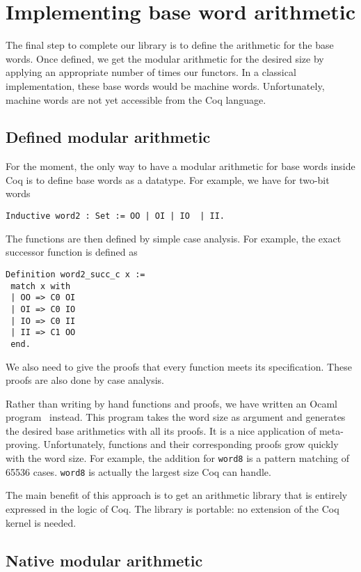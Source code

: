 \section{Implementing base word arithmetic \label{word}}

The final step to complete our library is to define the arithmetic for the 
base words. 
Once defined,  we get the modular arithmetic for the desired size by 
applying an appropriate number of times our functors. 
In a classical implementation, these base words would be machine words.
Unfortunately, machine words are not yet accessible from the {\sc Coq} 
language. 

\subsection{Defined modular arithmetic}

For the moment, the only way to have a modular arithmetic for base words 
inside {\sc Coq} is to define base words as a datatype. 
For example, we have for two-bit words
\begin{verbatim}
Inductive word2 : Set := OO | OI | IO  | II.
\end{verbatim}
The functions are then defined by simple case analysis. For example,
the exact successor function is defined as
\begin{verbatim}
Definition word2_succ_c x :=
 match x with
 | OO => C0 OI
 | OI => C0 IO
 | IO => C0 II
 | II => C1 OO
 end.
\end{verbatim}
We also need to give the proofs that every function meets its specification.
These proofs are also done by case analysis. 

Rather than writing by hand functions and proofs, we have
written an {\sc Ocaml} program~\cite{Ocaml} instead.
This program takes the word size as argument and generates the 
desired base arithmetics with all its proofs. 
It is a nice application of meta-proving. Unfortunately, 
functions and their corresponding proofs grow quickly with the word size. 
For example, the addition for {\tt word8} is a pattern matching of 
65536 cases. {\tt word8} is actually the largest size {\sc Coq} can handle. 

The main benefit of  this approach is to get an arithmetic library that is 
entirely expressed in the logic of {\sc Coq}. The library is portable: 
no extension of the {\sc Coq} kernel is needed. 

\subsection{Native modular arithmetic}

